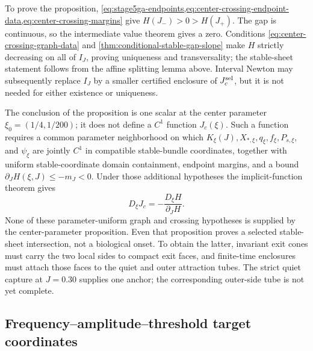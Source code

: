 To prove the proposition,
\cref{eq:stage5ga-endpoints,eq:center-crossing-endpoint-data,eq:center-crossing-margins}
give
\(H(J_-)>0>H(J_+)\).  The gap is continuous,
so the intermediate value theorem gives a zero.  Conditions
\cref{eq:center-crossing-graph-data} and
\cref{thm:conditional-stable-gap-slope} make \(H\) strictly decreasing on
all of \(I_J\), proving uniqueness and transversality; the stable-sheet
statement follows from the affine splitting lemma above.  Interval Newton
may subsequently replace \(I_J\) by a smaller certified enclosure of
\(J_c^{\rm sel}\), but it is not needed for either existence or uniqueness.

The conclusion of the proposition is one scalar at the center parameter
\(\xi_0=(1/4,1/200)\); it does not define a \(C^1\) function
\(J_c(\xi)\).  Such a function requires a common parameter neighborhood on
which \(K_\xi(J),X_{*,\xi},q_\xi,f_\xi,P_{s,\xi}\), and \(\psi_\xi\) are jointly
\(C^1\) in compatible stable-bundle coordinates, together with uniform
stable-coordinate domain containment, endpoint margins, and a bound
\(\partial_JH(\xi,J)\le-m_J<0\).  Under those additional hypotheses the
implicit-function theorem gives
\begin{equation}
 D_\xi J_c=-\frac{D_\xi H}{\partial_JH}.               \label{eq:Jc-derivative}
\end{equation}
None of these parameter-uniform graph and crossing hypotheses is supplied by
the center-parameter proposition.  Even that proposition proves a selected
stable-sheet intersection, not a biological onset.
To obtain the latter, invariant exit cones must carry the two local sides to
compact exit faces, and finite-time enclosures must attach those faces to the
quiet and outer attraction tubes.  The strict quiet capture at \(J=0.30\)
supplies one anchor; the corresponding outer-side tube is not yet complete.

\subsection{Frequency--amplitude--threshold target coordinates}

